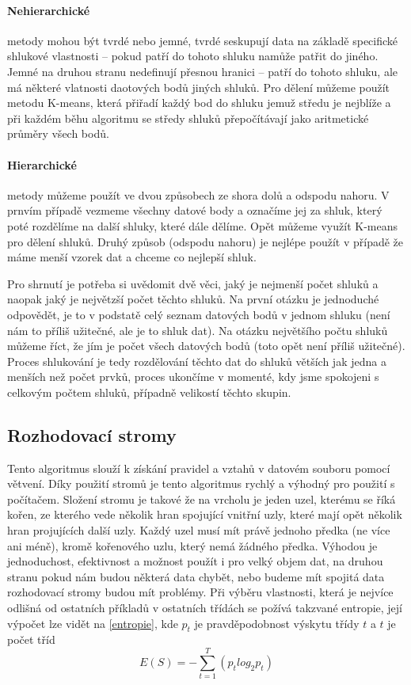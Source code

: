 \paragraph{Nehierarchické} metody mohou být tvrdé nebo jemné, tvrdé seskupují data na základě specifické shlukové vlastnosti -- pokud patří do tohoto shluku namůže patřit do jiného. Jemné na druhou stranu nedefinují přesnou hranici -- patří do tohoto shluku, ale má některé vlatnosti daotových bodů jiných shluků. Pro dělení můžeme použít metodu K-means, která přiřadí každý bod do shluku jemuž středu je nejblíže a při každém běhu algoritmu se středy shluků přepočítávají jako aritmetické průměry všech bodů.

\paragraph{Hierarchické} metody můžeme použít ve dvou způsobech ze shora dolů a odspodu nahoru. V prnvím případě vezmeme všechny datové body a označíme jej za shluk, který poté rozdělíme na další shluky, které dále dělíme. Opět můžeme využít K-means pro dělení shluků. Druhý způsob (odspodu nahoru) je nejlépe použít v případě že máme menší vzorek dat a chceme co nejlepší shluk.

\par Pro shrnutí je potřeba si uvědomit dvě věci, jaký je nejmenší počet shluků a naopak jaký je největzší počet těchto shluků. Na první otázku je jednoduché odpovědět, je to v podstatě celý seznam datových bodů v jednom shluku (není nám to příliš užitečné, ale je to shluk dat). Na otázku největšího počtu shluků můžeme říct, že jím je počet všech datových bodů (toto opět není příliš užitečné). Proces shlukování je tedy rozdělování těchto dat do shluků větších jak jedna a menších než počet prvků, proces ukončíme v momenté, kdy jsme spokojeni s celkovým počtem shluků, případně velikostí těchto skupin.

\subsection{Rozhodovací stromy}
\par Tento algoritmus slouží k získání pravidel a vztahů v datovém souboru pomocí větvení. Díky použití stromů je tento algoritmus rychlý a výhodný pro použití s počítačem. Složení stromu je takové že na vrcholu je jeden uzel, kterému se říká kořen, ze kterého vede několik hran spojující vnitřní uzly, které mají opět několik hran projujících další uzly. Každý uzel musí mít právě jednoho předka (ne více ani méně), kromě kořenového uzlu, který nemá žádného předka. Výhodou je jednoduchost, efektivnost a možnost použít i pro velký objem dat, na druhou stranu pokud nám budou některá data chybět, nebo budeme mít spojitá data rozhodovací stromy budou mít problémy. Při výběru vlastnosti, která je nejvíce odlišná od ostatních příkladů v ostatních třídách se požívá takzvané entropie, její výpočet lze vidět na \ref{entropie}, kde \(p_t\) je pravděpodobnost výskytu třídy \(t\) a \(t\) je počet tříd
\begin{equation} \label{entropie}
E(S) = - \sum_{t=1}^{T}(p_t log_2 p_t)
\end{equation}

